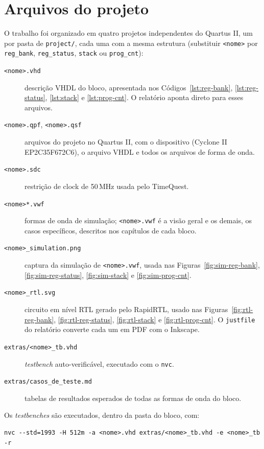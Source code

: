 \chapter{Arquivos do projeto}
\label{ap:arquivos}

O trabalho foi organizado em quatro projetos independentes do Quartus II, um por pasta de \texttt{project/}, cada uma com a mesma estrutura (substituir \texttt{<nome>} por \texttt{reg\_bank}, \texttt{reg\_status}, \texttt{stack} ou \texttt{prog\_cnt}):

\begin{description}
  \item[\texttt{<nome>.vhd}] descrição VHDL do bloco, apresentada nos Códigos~\ref{lst:reg-bank}, \ref{lst:reg-status}, \ref{lst:stack} e \ref{lst:prog-cnt}. O relatório aponta direto para esses arquivos.
  \item[\texttt{<nome>.qpf}, \texttt{<nome>.qsf}] arquivos do projeto no Quartus II, com o dispositivo (Cyclone II EP2C35F672C6), o arquivo VHDL e todos os arquivos de forma de onda.
  \item[\texttt{<nome>.sdc}] restrição de clock de 50\,MHz usada pelo TimeQuest.
  \item[\texttt{<nome>*.vwf}] formas de onda de simulação; \texttt{<nome>.vwf} é a visão geral e os demais, os casos específicos, descritos nos capítulos de cada bloco.
  \item[\texttt{<nome>\_simulation.png}] captura da simulação de \texttt{<nome>.vwf}, usada nas Figuras~\ref{fig:sim-reg-bank}, \ref{fig:sim-reg-status}, \ref{fig:sim-stack} e \ref{fig:sim-prog-cnt}.
  \item[\texttt{<nome>\_rtl.svg}] circuito em nível RTL gerado pelo RapidRTL, usado nas Figuras~\ref{fig:rtl-reg-bank}, \ref{fig:rtl-reg-status}, \ref{fig:rtl-stack} e \ref{fig:rtl-prog-cnt}. O \texttt{justfile} do relatório converte cada um em PDF com o Inkscape.
  \item[\texttt{extras/<nome>\_tb.vhd}] \textit{testbench} auto-verificável, executado com o \texttt{nvc}.
  \item[\texttt{extras/casos\_de\_teste.md}] tabelas de resultados esperados de todas as formas de onda do bloco.
\end{description}

Os \textit{testbenches} são executados, dentro da pasta do bloco, com:

\begingroup\footnotesize
\begin{verbatim}
nvc --std=1993 -H 512m -a <nome>.vhd extras/<nome>_tb.vhd -e <nome>_tb -r
\end{verbatim}
\endgroup

